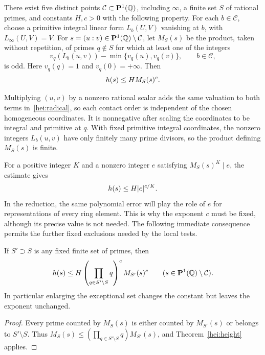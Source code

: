 \begin{theorem}\label{hei:height}
There exist five distinct points $\mathcal C\subset\mathbf P^1(\mathbb Q)$,
including $\infty$, a finite set $S$ of rational primes, and constants
$H,c>0$ with the following property.  For each $b\in\mathcal C$, choose
a primitive integral linear form $L_b(U,V)$ vanishing at $b$, with
$L_\infty(U,V)=V$. For
$s=(u:v)\in\mathbf P^1(\mathbb Q)\setminus\mathcal C$, let $M_S(s)$ be the
product, taken without repetition, of primes $q\notin S$ for which
at least one of the integers
\begin{equation}\label{hei:radical}
 v_q(L_b(u,v))-\min\{v_q(u),v_q(v)\},\qquad b\in\mathcal C,
\end{equation}
is odd. Here $v_q(q)=1$ and $v_q(0)=+\infty$. Then
\begin{equation}\label{hei:height-bound}
                    h(s)\le H M_S(s)^c.
\end{equation}
\end{theorem}

Multiplying $(u,v)$ by a nonzero rational scalar adds the same valuation
to both terms in~\eqref{hei:radical}, so each contact order is independent
of the chosen homogeneous coordinates.  It is nonnegative after scaling
the coordinates to be integral and primitive at $q$.  With fixed primitive
integral coordinates, the nonzero integers $L_b(u,v)$ have only finitely
many prime divisors, so the product defining $M_S(s)$ is finite.



For a positive integer \(K\) and a nonzero integer \(e\) satisfying
\(M_S(s)^K\mid e\), the estimate gives
\[
                         h(s)\le H|e|^{c/K}.
\]
In the reduction, the same polynomial error will play the role of \(e\)
for representations of every ring element.  This is why the exponent
\(c\) must be fixed, although its precise value is not needed.
The following immediate consequence permits the further fixed exclusions
needed by the local tests.

\begin{corollary}\label{hei:enlarge-exceptions}
If $S'\supset S$ is any fixed finite set of primes, then
\[
 h(s)\le H\left(\prod_{q\in S'\setminus S}q\right)^c
                      M_{S'}(s)^c
 \qquad(s\in\mathbf P^1(\mathbb Q)\setminus\mathcal C).
\]
In particular enlarging the exceptional set changes the constant
but leaves the exponent unchanged.
\end{corollary}

\begin{proof}
Every prime counted by $M_S(s)$ is either counted by $M_{S'}(s)$ or
belongs to $S'\setminus S$.  Thus
$M_S(s)\le(\prod_{q\in S'\setminus S}q)M_{S'}(s)$, and
Theorem~\ref{hei:height} applies.
\end{proof}

